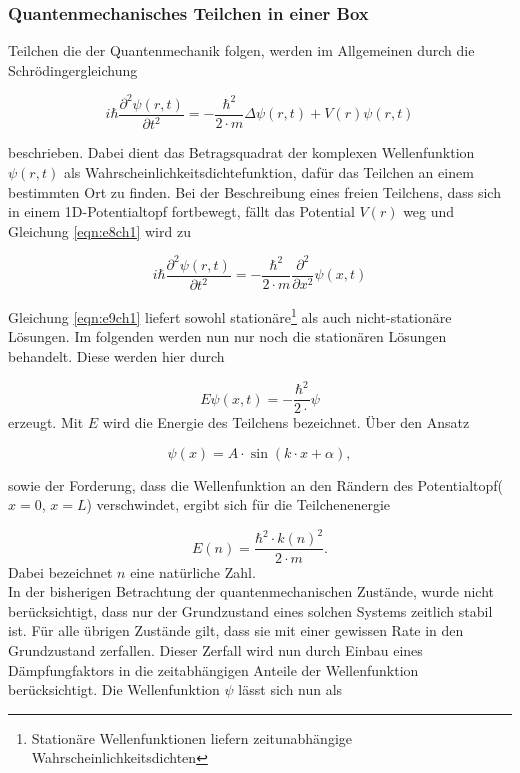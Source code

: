 \subsubsection{Quantenmechanisches Teilchen in einer Box}
\label{subsubsec:tch12}
Teilchen die der Quantenmechanik folgen, werden im Allgemeinen
durch die Schrödingergleichung


\begin{equation}
  \label{eqn:e8ch1}
  i \hbar \frac{\partial ^2 \psi(r,t)}{\partial  t^2} = -\frac{\hbar^2}{2\cdot m} \Delta  \psi(r,t) + V(r) \psi(r,t)
\end{equation}

beschrieben.
Dabei dient das Betragsquadrat der komplexen Wellenfunktion $\psi(r,t)$
als Wahrscheinlichkeitsdichtefunktion, dafür das Teilchen an
einem bestimmten Ort zu finden.
Bei der Beschreibung eines freien Teilchens, dass sich in einem
1D-Potentialtopf fortbewegt, fällt das Potential $V(r)$
weg und Gleichung \eqref{eqn:e8ch1} wird zu


\begin{equation}
  \label{eqn:e9ch1}
  i \hbar \frac{\partial ^2 \psi(r,t)}{\partial  t^2} = -\frac{\hbar^2}{2\cdot m}
  \frac{\partial ^2}{\partial  x^2} \psi(x, t)
\end{equation}

Gleichung \eqref{eqn:e9ch1} liefert sowohl stationäre\footnote{Stationäre
Wellenfunktionen liefern zeitunabhängige Wahrscheinlichkeitsdichten}
als auch nicht-stationäre Lösungen. Im folgenden werden
nun nur noch die stationären Lösungen behandelt.
Diese werden hier durch


\begin{equation}
  \label{e10ch1}
  E \psi(x,t) = - \frac{\hbar^2}{2 \cdot} \psi
\end{equation}
erzeugt. Mit $E$ wird die Energie des Teilchens bezeichnet.
Über den Ansatz


\begin{equation}
  \label{eqn:e11ch1}
  \psi(x) = A \cdot \sin\left( k \cdot x + \alpha \right),
\end{equation}

sowie der Forderung, dass die Wellenfunktion an den Rändern des
Potentialtopf($x = 0$, $x = L$) verschwindet, ergibt sich
für die Teilchenenergie


\begin{equation}
  \label{eqn:e12ch1}
  E(n) = \frac{\hbar^2 \cdot k(n)^2}{2\cdot m}.
\end{equation}
Dabei bezeichnet $n$ eine natürliche Zahl.\\
In der bisherigen Betrachtung der quantenmechanischen Zustände, wurde nicht berücksichtigt, dass
nur der Grundzustand eines solchen Systems zeitlich stabil ist. Für alle übrigen Zustände gilt, dass
sie mit einer gewissen Rate in den Grundzustand zerfallen. Dieser Zerfall wird nun durch Einbau eines Dämpfungfaktors
in die zeitabhängigen Anteile der Wellenfunktion berücksichtigt. Die Wellenfunktion $\psi$ lässt sich nun als


